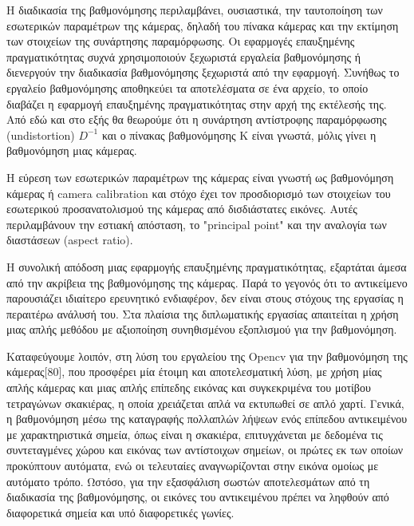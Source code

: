 Η διαδικασία της βαθμονόμησης περιλαμβάνει, ουσιαστικά, την ταυτοποίηση των εσωτερικών παραμέτρων της κάμερας, δηλαδή του πίνακα κάμερας και την εκτίμηση των στοιχείων της συνάρτησης παραμόρφωσης. Οι εφαρμογές επαυξημένης πραγματικότητας συχνά χρησιμοποιούν ξεχωριστά εργαλεία βαθμονόμησης ή διενεργούν την διαδικασία βαθμονόμησης ξεχωριστά από την εφαρμογή. Συνήθως το εργαλείο βαθμονόμησης αποθηκεύει τα αποτελέσματα σε ένα αρχείο, το οποίο διαβάζει η εφαρμογή επαυξημένης πραγματικότητας στην αρχή της εκτέλεσής της. Από εδώ και στο εξής θα θεωρούμε ότι η συνάρτηση αντίστροφης παραμόρφωσης (undistortion) $D^{-1}$ και ο πίνακας βαθμονόμησης Κ είναι γνωστά, μόλις γίνει η βαθμονόμηση μιας κάμερας.


Η εύρεση των εσωτερικών παραμέτρων της κάμερας είναι γνωστή ως βαθμονόμηση κάμερας ή camera calibration και στόχο έχει τον προσδιορισμό των στοιχείων του εσωτερικού προσανατολισμού της κάμερας από δισδιάστατες εικόνες. Αυτές περιλαμβάνουν την εστιακή απόσταση, το "principal point" και την αναλογία των διαστάσεων (aspect ratio). 

Η συνολική απόδοση μιας εφαρμογής επαυξημένης πραγματικότητας, εξαρτάται άμεσα από την ακρίβεια της βαθμονόμησης της κάμερας. Παρά το γεγονός ότι το αντικείμενο παρουσιάζει ιδιαίτερο ερευνητικό ενδιαφέρον, δεν είναι στους στόχους της εργασίας η περαιτέρω ανάλυσή του. Στα πλαίσια της διπλωματικής εργασίας απαιτείται η χρήση μιας απλής μεθόδου με αξιοποίηση συνηθισμένου εξοπλισμού για την βαθμονόμηση. 


Καταφεύγουμε λοιπόν, στη λύση του εργαλείου της Opencv για την βαθμονόμηση της κάμερας[80], που προσφέρει μία έτοιμη και αποτελεσματική λύση, με χρήση μίας απλής κάμερας και μιας απλής επίπεδης εικόνας και συγκεκριμένα του μοτίβου τετραγώνων σκακιέρας, η οποία χρειάζεται απλά να εκτυπωθεί σε απλό χαρτί. 
Γενικά, η βαθμονόμηση μέσω της καταγραφής πολλαπλών λήψεων ενός επίπεδου αντικειμένου με χαρακτηριστικά σημεία, όπως είναι η σκακιέρα, επιτυγχάνεται με δεδομένα τις συντεταγμένες χώρου και εικόνας των αντίστοιχων σημείων, οι πρώτες εκ των οποίων προκύπτουν αυτόματα, ενώ οι τελευταίες αναγνωρίζονται στην εικόνα ομοίως με αυτόματο τρόπο. Ωστόσο, για την εξασφάλιση σωστών αποτελεσμάτων από τη διαδικασία της βαθμονόμησης, οι εικόνες του αντικειμένου πρέπει να ληφθούν από διαφορετικά σημεία και υπό διαφορετικές γωνίες. 





